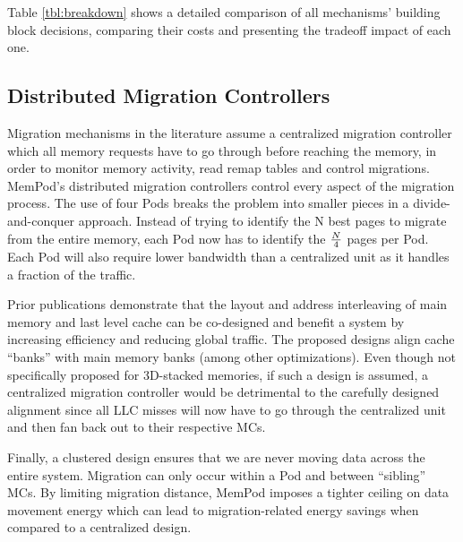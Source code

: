 Table \ref{tbl:breakdown} shows a detailed comparison of all mechanisms' building block decisions, comparing their costs and presenting the tradeoff impact of each one.


\subsection{Distributed Migration Controllers}


Migration mechanisms in the literature \cite{sim-micro2014,cameo} assume a centralized migration controller which all memory requests have to go through before reaching the memory, in order to monitor memory activity, read remap tables and control migrations. MemPod's distributed migration controllers control every aspect of the migration process. The use of four Pods breaks the problem into smaller pieces in a divide-and-conquer approach. Instead of trying to identify the N best pages to migrate from the entire memory, each Pod now has to identify the $N\over4$ pages per Pod. Each Pod will also require lower bandwidth than a centralized unit as it handles a fraction of the traffic.

Prior publications \cite{loh-isca08} demonstrate that the layout and address interleaving of main memory and last level cache can be co-designed and benefit a system by increasing efficiency and reducing global traffic. The proposed designs align cache ``banks'' with main memory banks (among other optimizations). Even though not specifically proposed for 3D-stacked memories, if such a design is assumed, a centralized migration controller would be detrimental to the carefully designed alignment since all LLC misses will now have to go through the centralized unit and then fan back out to their respective MCs.

Finally, a clustered design ensures that we are never moving data across the entire system. Migration can only occur within a Pod and between ``sibling'' MCs. By limiting migration distance, MemPod imposes a tighter ceiling on data movement energy which can lead to migration-related energy savings when compared to a centralized design.
